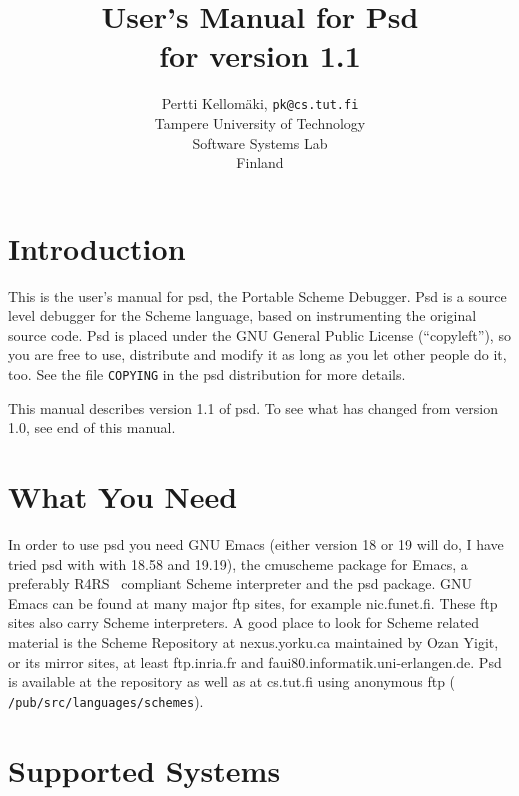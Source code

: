 

\newcommand{\scheme}[1]{{\tt #1}}

\author{Pertti Kellom\"aki, {\tt pk@cs.tut.fi}\\ 
\small Tampere University of Technology \\
\small Software Systems Lab \\
\small Finland}
\title{User's Manual for Psd \\ \small for version 1.1}
\maketitle

\section{Introduction}
\label{sec:intro}

This is the user's manual for psd,  the Portable Scheme Debugger. Psd
is a source level debugger for the Scheme language, based on
instrumenting the original source code. Psd is placed under the GNU
General Public License (``copyleft''), so you are free to use,
distribute and modify it as long as you let other people do it, too.
See the file {\tt COPYING} in the psd distribution for more details.

This manual describes version 1.1 of psd. To see what has changed from
version 1.0, see end of this manual.

\section{What You Need}
\label{sec:requirements}

In order to use psd you need GNU Emacs (either version 18 or 19 will
do, I have tried psd with with 18.58 and 19.19), the cmuscheme package
for Emacs, a preferably R4RS~\cite{r4rs} compliant Scheme interpreter
and the psd package. GNU Emacs can be found at many major ftp sites,
for example nic.funet.fi. These ftp sites also carry Scheme
interpreters. A good place to look for Scheme related material is the
Scheme Repository at nexus.yorku.ca maintained by Ozan Yigit, or its
mirror sites, at least ftp.inria.fr and
faui80.informatik.uni-erlangen.de. Psd is available at the 
repository as well as at cs.tut.fi using anonymous ftp ({\tt
/pub/src/languages/schemes}).

\section{Supported Systems}


